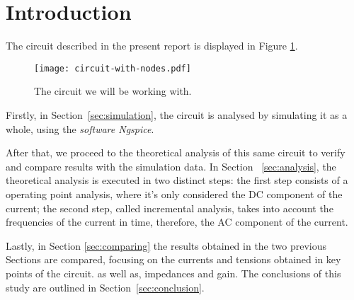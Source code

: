 \newpage
\section{Introduction}
\label{sec:introduction}



The circuit described in the present report is displayed in Figure \ref{fig:circuit}.

\begin{figure}[h] \centering
\texttt{[image: circuit-with-nodes.pdf]}
\caption{The circuit we will be working with.}
\label{fig:circuit}
\end{figure}


Firstly, in Section~\ref{sec:simulation}, the circuit is analysed by simulating it as a whole, using the \textit{software Ngspice}.

After that, we proceed to the theoretical analysis of this same circuit to verify and compare results with the simulation data. In Section ~\ref{sec:analysis}, the theoretical analysis is executed in two distinct steps: the first step consists of a operating point analysis, where it's only considered the DC component of the current; the second step, called incremental analysis, takes into account the frequencies of the current in time, therefore, the AC component of the current.

Lastly, in Section \ref{sec:comparing} the results obtained in the two previous Sections are compared, focusing on the currents and tensions obtained in key points of the circuit. as well as, impedances and gain.
The conclusions of this study are outlined in Section~\ref{sec:conclusion}.